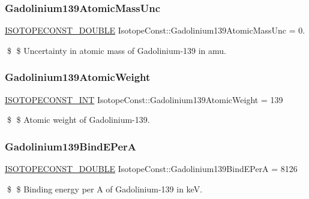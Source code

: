 \subsubsection{\texorpdfstring{Gadolinium139\+Atomic\+Mass\+Unc}{Gadolinium139AtomicMassUnc}}
{\footnotesize\ttfamily \mbox{\hyperlink{group___isotope_const-_macros_ga8f45a7272ce02c0b4c65c44636ed719a}{I\+S\+O\+T\+O\+P\+E\+C\+O\+N\+S\+T\+\_\+\+D\+O\+U\+B\+LE}} Isotope\+Const\+::\+Gadolinium139\+Atomic\+Mass\+Unc = 0.}

\$ \$ Uncertainty in atomic mass of Gadolinium-\/139 in amu. \mbox{\label{group___isotope_const-_gadolinium-_gd139_gaae6bdb0ebaf6646b96fb95a7edf3ca5c}} 
\subsubsection{\texorpdfstring{Gadolinium139\+Atomic\+Weight}{Gadolinium139AtomicWeight}}
{\footnotesize\ttfamily \mbox{\hyperlink{group___isotope_const-_macros_ga5f18360b3e99483a35c32d789e62621c}{I\+S\+O\+T\+O\+P\+E\+C\+O\+N\+S\+T\+\_\+\+I\+NT}} Isotope\+Const\+::\+Gadolinium139\+Atomic\+Weight = 139}

\$ \$ Atomic weight of Gadolinium-\/139. \mbox{\label{group___isotope_const-_gadolinium-_gd139_gadf91438aa40e0f6b8648d8df0bec23e0}} 
\subsubsection{\texorpdfstring{Gadolinium139\+Bind\+E\+PerA}{Gadolinium139BindEPerA}}
{\footnotesize\ttfamily \mbox{\hyperlink{group___isotope_const-_macros_ga8f45a7272ce02c0b4c65c44636ed719a}{I\+S\+O\+T\+O\+P\+E\+C\+O\+N\+S\+T\+\_\+\+D\+O\+U\+B\+LE}} Isotope\+Const\+::\+Gadolinium139\+Bind\+E\+PerA = 8126}

\$ \$ Binding energy per A of Gadolinium-\/139 in keV. \mbox{\label{group___isotope_const-_gadolinium-_gd139_ga6f13fb14d3d832667ef25beaefe080a0}} 
